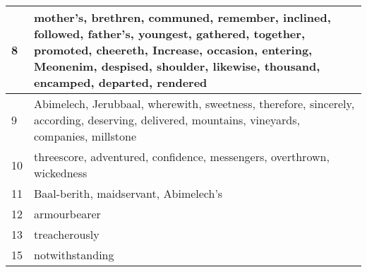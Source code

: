 \begin{center}
\begin{longtable}{l|p{3.75in}}
8 & mother's, brethren, communed, remember, inclined, followed, father's, youngest, gathered, together, promoted, cheereth, Increase, occasion, entering, Meonenim, despised, shoulder, likewise, thousand, encamped, departed, rendered\\ \hline 
9 & Abimelech, Jerubbaal, wherewith, sweetness, therefore, sincerely, according, deserving, delivered, mountains, vineyards, companies, millstone\\ \hline 
10 & threescore, adventured, confidence, messengers, overthrown, wickedness\\ \hline 
11 & Baal-berith, maidservant, Abimelech's\\ \hline 
12 & armourbearer\\ \hline 
13 & treacherously\\ \hline 
15 & notwithstanding\\ \hline 
\end{longtable}
\end{center}





